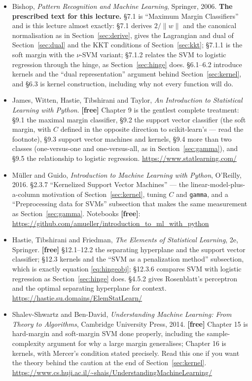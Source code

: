 \documentclass[11pt]{article}
\begin{document}
\begin{itemize}[leftmargin=*]
  \item Bishop, \emph{Pattern Recognition and Machine Learning}, Springer,
    2006. \textbf{The prescribed text for this lecture.} \S7.1 is
    ``Maximum Margin Classifiers'' and is this lecture almost exactly:
    \S7.1 derives $2/\|w\|$ and the canonical normalisation as in
    Section~\ref{sec:derive}, gives the Lagrangian and dual of
    Section~\ref{sec:dual} and the KKT conditions of Section~\ref{sec:kkt};
    \S7.1.1 is the soft margin with the $\nu$-SVM variant; \S7.1.2 relates the
    SVM to logistic regression through the hinge, as Section~\ref{sec:hinge}
    does. \S6.1--6.2 introduce kernels and the ``dual representation''
    argument behind Section~\ref{sec:kernel}, and \S6.3 is kernel
    construction, including why not every function will do.
  \item James, Witten, Hastie, Tibshirani and Taylor, \emph{An Introduction to
    Statistical Learning with Python}. \textbf{[free]} Chapter 9 is the
    gentlest complete treatment: \S9.1 the maximal margin classifier,
    \S9.2 the support vector classifier (the soft margin, with $C$ defined in
    the opposite direction to scikit-learn's --- read the footnote),
    \S9.3 support vector machines and kernels, \S9.4 more than two classes
    (one-versus-one and one-versus-all, as in Section~\ref{sec:gamma}), and
    \S9.5 the relationship to logistic regression.
    \url{https://www.statlearning.com/}
  \item M\"uller and Guido, \emph{Introduction to Machine Learning with
    Python}, O'Reilly, 2016. \S2.3.7 ``Kernelized Support Vector Machines'' ---
    the linear-model-plus-a-column motivation of
    Section~\ref{sec:kernel}, tuning $C$ and \texttt{gamma}, and a
    ``Preprocessing data for SVMs'' subsection that makes the same measurement
    as Section~\ref{sec:gamma}. Notebooks \textbf{[free]}:
    \url{https://github.com/amueller/introduction_to_ml_with_python}
  \item Hastie, Tibshirani and Friedman, \emph{The Elements of Statistical
    Learning}, 2e, Springer. \textbf{[free]} \S12.1--12.2 the separating
    hyperplane and the support vector classifier; \S12.3 kernels and the
    ``SVM as a penalization method'' subsection, which is exactly equation
    \eqref{eq:hingeobj}; \S12.3.6 compares SVM with logistic regression as
    Section~\ref{sec:hinge} does. \S4.5.2 gives Rosenblatt's perceptron and the
    optimal separating hyperplane for context.
    \url{https://hastie.su.domains/ElemStatLearn/}
  \item Shalev-Shwartz and Ben-David, \emph{Understanding Machine Learning:
    From Theory to Algorithms}, Cambridge University Press, 2014.
    \textbf{[free]} Chapter 15 is hard-margin and soft-margin SVM done
    properly, including the sample-complexity argument for why a large margin
    generalises; Chapter 16 is kernels, with Mercer's condition stated
    precisely. Read this one if you want the theory behind the caution at the
    end of Section~\ref{sec:kernel}.
    \url{https://www.cs.huji.ac.il/~shais/UnderstandingMachineLearning/}
\end{itemize}
\end{document}
